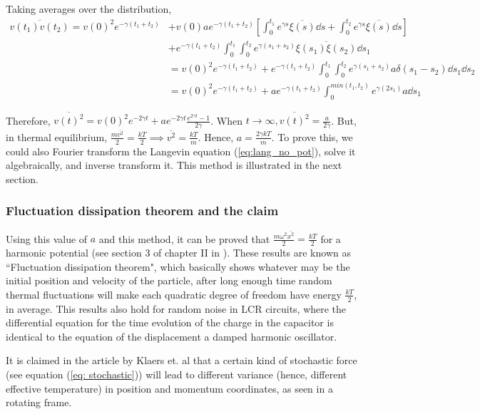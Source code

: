 \documentclass[12pt, twoside]{article}
\begin{document}
Taking averages over the distribution,\\
$\begin{aligned}\overline{v(t_1) v(t_2)} = v(0)^2 e^{-\gamma(t_1 + t_2)} &+ v(0) a e^{-\gamma(t_1 + t_2)} \left[\int_{0}^{t_1} e^{\gamma s} \overline{\xi(s)} \dd{s} + \int_{0}^{t_2} e^{\gamma s} \overline{\xi(s)} \dd{s}\right] \\&+ e^{-\gamma(t_1 + t_2)} \int_{0}^{t_1}\int_{0}^{t_2} e^{\gamma(s_1 + s_2)} \overline{\xi(s_1)\xi(s_2)} \dd{s_1} \\ &= v(0)^2 e^{-\gamma(t_1 + t_2)} + e^{-\gamma(t_1 + t_2)} \int_{0}^{t_1}\int_{0}^{t_2} e^{\gamma(s_1 + s_2)} {a} \delta(s_1 - s_2) \dd{s_1} \dd{s_2} \\ &= v(0)^2 e^{-\gamma(t_1 + t_2)} + a  e^{-\gamma(t_1 + t_2)} \int_{0}^{min(t_1,t_2)} e^{\gamma(2 s_1)} {a} \dd{s_1} \end{aligned}$

Therefore, $\overline{v(t)^2} = v(0)^2 e^{-2\gamma t} + a e^{-2\gamma t}\frac{e^{2\gamma t} - 1}{2\gamma}$. When $t \rightarrow \infty, \overline{v(t)^2} = \frac{a}{2\gamma}$. But, in thermal equilibrium, $\frac{m\overline{v^2}}{2} =\frac{k T}{2} \implies \overline{v^2} = \frac{kT}{m}$. Hence, $a = \frac{2 \gamma k T}{m}$. To prove this, we could also Fourier transform the Langevin equation (\ref{eq:lang_no_pot}), solve it algebraically, and inverse transform it. This method is illustrated in the next section.
\subsubsection{Fluctuation dissipation theorem and the claim}
Using this value of $a$ and this method, it can be proved that $\frac{m \omega^2 \overline{x^2}}{2} = \frac{k T}{2}$ for a harmonic potential (see section 3 of chapter II in \cite{chandrashekhar_stochastic_physics_astro}). These results are known as ``Fluctuation dissipation theorem", which basically shows whatever may be the initial position and velocity of the particle, after long enough time random thermal fluctuations will make each quadratic degree of freedom have energy $\frac{kT}{2}$, in average. This results also hold for random noise in LCR circuits, where the differential equation for the time evolution of the charge in the capacitor is identical to the equation of the displacement a damped harmonic oscillator. 

It is claimed in the article by Klaers et. al \cite{klaers} that a certain kind of stochastic force (see equation (\ref{eq: stochastic})) will lead to different variance (hence, different effective temperature) in position and momentum coordinates, as seen in a rotating frame.
\end{document}
